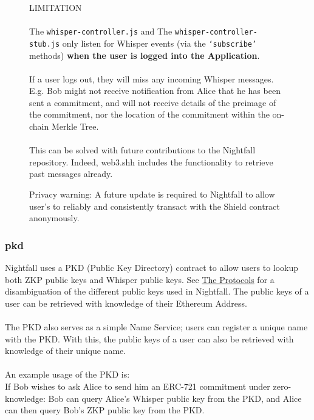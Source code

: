 \documentclass{article}
\begin{document}
\begin{figure}[H]
  \begin{center}
    \begin{mdframed}[backgroundcolor=verylightred]
      \noindent
      LIMITATION\\
      \\
      The \texttt{whisper-controller.js} and The \texttt{whisper-controller-stub.js} only listen for Whisper events (via the \texttt{`subscribe'} methods) \textbf{when the user is logged into the Application}.\\
      \\
      If a user logs out, they will miss any incoming Whisper messages. E.g. Bob might not receive notification from Alice that he has been sent a commitment, and will not receive details of the preimage of the commitment, nor the location of the commitment within the on-chain Merkle Tree.\\
      \\
      This can be solved with future contributions to the Nightfall repository. Indeed, web3.shh includes the functionality to retrieve past messages already.
    \end{mdframed}
  \end{center}
  \caption{Privacy warning: A future update is required to Nightfall to allow user's to reliably and consistently transact with the Shield contract anonymously.}
\end{figure}

\subsubsection{pkd}
\label{sec:pkd}

Nightfall uses a PKD (Public Key Directory) contract to allow users to lookup both ZKP public keys and Whisper public keys. See \hyperref[part:theProtocols]{The Protocols} for a disambiguation of the different public keys used in Nightfall. The public keys of a user can be retrieved with knowledge of their Ethereum Address.\\
\\
The PKD also serves as a simple Name Service; users can register a unique name with the PKD. With this, the public keys of a user can also be retrieved with knowledge of their unique name.\\
\\
An example usage of the PKD is:\\
If Bob wishes to ask Alice to send him an ERC-721 commitment under zero-knowledge: Bob can query Alice's Whisper public key from the PKD, and Alice can then query Bob's ZKP public key from the PKD.
\end{document}
